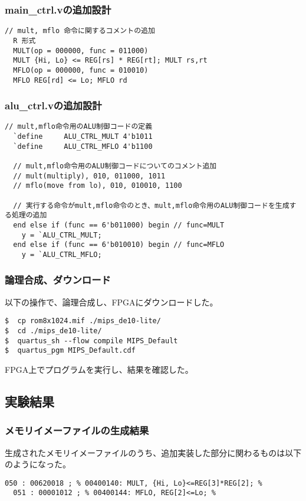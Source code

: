 \subsubsection{main\_ctrl.vの追加設計}
\begin{lstlisting}[caption={main\_ctri.vの変更},label={mainctri.vの変更9}]
  // mult, mflo 命令に関するコメントの追加
  R 形式
  MULT(op = 000000, func = 011000)
  MULT {Hi, Lo} <= REG[rs] * REG[rt]; MULT rs,rt
  MFLO(op = 000000, func = 010010)
  MFLO REG[rd] <= Lo; MFLO rd
\end{lstlisting}

\subsubsection{alu\_ctrl.vの追加設計}
\begin{lstlisting}[caption={alu\_ctrl.v},label={aluctrl.v9}]
  // mult,mflo命令用のALU制御コードの定義
  `define     ALU_CTRL_MULT 4'b1011
  `define     ALU_CTRL_MFLO 4'b1100
  
  // mult,mflo命令用のALU制御コードについてのコメント追加
  // mult(multiply), 010, 011000, 1011
  // mflo(move from lo), 010, 010010, 1100
  
  // 実行する命令がmult,mflo命令のとき、mult,mflo命令用のALU制御コードを生成する処理の追加
  end else if (func == 6'b011000) begin // func=MULT
    y = `ALU_CTRL_MULT;
  end else if (func == 6'b010010) begin // func=MFLO
    y = `ALU_CTRL_MFLO;
\end{lstlisting}

\subsubsection{論理合成、ダウンロード}
以下の操作で、論理合成し、FPGAにダウンロードした。
\begin{lstlisting}[caption={論理合成、ダウンロード},label={論理合成、ダウンロード9}]
$  cp rom8x1024.mif ./mips_de10-lite/
$  cd ./mips_de10-lite/
$  quartus_sh --flow compile MIPS_Default
$  quartus_pgm MIPS_Default.cdf
\end{lstlisting}

FPGA上でプログラムを実行し、結果を確認した。

\subsection{実験結果}
\subsubsection{メモリイメーファイルの生成結果}
生成されたメモリイメーファイルのうち、追加実装した部分に関わるものは以下のようになった。
\begin{lstlisting}[caption={メモリイメーファイルの追加実装に関わる部分},label={メモリイメーファイルの追加実装に関わる部分}]
  050 : 00620018 ; % 00400140: MULT, {Hi, Lo}<=REG[3]*REG[2]; %
  051 : 00001012 ; % 00400144: MFLO, REG[2]<=Lo; %
\end{lstlisting}

